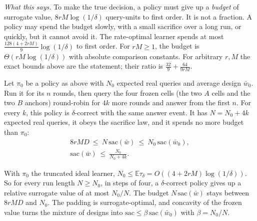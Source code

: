 
\emph{What this says.} To make the true decision, a policy must give up a \emph{budget} of
surrogate value, $8rM\log(1/\delta)$ query-units to first order. It is not a fraction. A policy
may spend the budget slowly, with a small sacrifice over a long run, or quickly, but it cannot
avoid it. The rate-optimal learner spends at most $\frac{128(4+2rM)}{9}\log(1/\delta)$ to first
order. For $rM\ge1$, the budget is $\Theta(rM\log(1/\delta))$ with absolute comparison constants.
For arbitrary $r,M$ the exact bounds above are the statement; their ratio is
$\frac{32}{9}+\frac{64}{9rM}$.

\begin{theorem}
\label{thm:dilute}
Let $\pi_{0}$ be a policy as above with $N_{0}$ expected real queries and average design
$\bar w_{0}$. Run it for its $n$ rounds, then query the four frozen cells (the two $A$ cells and the two $B$ anchors) round-robin for $4k$ more
rounds and answer from the first $n$. For every $k$, this policy is $\delta$-correct with the same
answer event. It has $N=N_{0}+4k$ expected real queries, it obeys the sacrifice law, and it spends
no more budget than $\pi_{0}$:
\begin{gather*}
8rMD\ \le\ N\,\mathrm{sac}(\bar w)\ \le\ N_{0}\,\mathrm{sac}(\bar w_{0}),\\
\mathrm{sac}(\bar w)\ \le\ \frac{N_{0}}{N_{0}+4k}.
\end{gather*}
\end{theorem}


With $\pi_{0}$ the truncated ideal learner, $N_{0}\le\mathbb{E}\tau_{\delta}
=O((4+2rM)\log(1/\delta))$. So for every run length $N\ge N_{0}$, in steps of four, a
$\delta$-correct policy gives up a relative surrogate value of at most $N_{0}/N$. The budget
$N\,\mathrm{sac}(\bar w)$ stays between $8rMD$ and $N_{0}$. The padding is surrogate-optimal, and
concavity of the frozen value turns the mixture of designs into
$\mathrm{sac}\le\beta\,\mathrm{sac}(\bar w_{0})$ with $\beta=N_{0}/N$.

